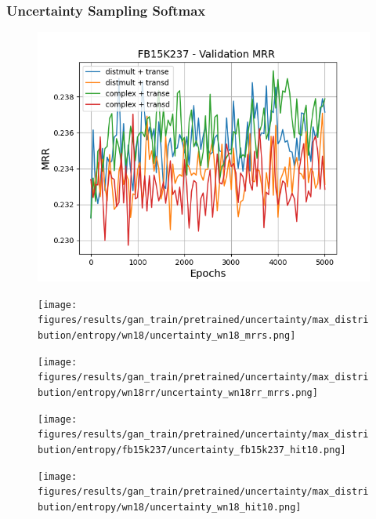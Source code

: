\subsubsection{Uncertainty Sampling Softmax}

\begin{figure}
    \centering
    \begin{minipage}{.3\textwidth}
      \centering
      \includegraphics[width=\linewidth]{figures/results/gan_train/pretrained/uncertainty/max_distribution/entropy/fb15k237/gan_train_uncertainty_fb15k237_mrrs.png}
    \end{minipage}%
    \begin{minipage}{.3\textwidth}
      \centering
      \texttt{[image: figures/results/gan\_train/pretrained/uncertainty/max\_distribution/entropy/wn18/uncertainty\_wn18\_mrrs.png]}
    \end{minipage}
    \begin{minipage}{.3\textwidth}
      \centering
      \texttt{[image: figures/results/gan\_train/pretrained/uncertainty/max\_distribution/entropy/wn18rr/uncertainty\_wn18rr\_mrrs.png]}
    \end{minipage}%
    \begin{minipage}{.3\textwidth}
      \centering
      \texttt{[image: figures/results/gan\_train/pretrained/uncertainty/max\_distribution/entropy/fb15k237/uncertainty\_fb15k237\_hit10.png]}
    \end{minipage}%
     \begin{minipage}{.3\textwidth}
      \centering
      \texttt{[image: figures/results/gan\_train/pretrained/uncertainty/max\_distribution/entropy/wn18/uncertainty\_wn18\_hit10.png]}

\end{minipage}
\end{figure}

